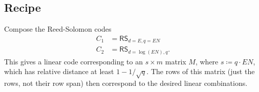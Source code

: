 \documentclass[11pt]{scrreprt}
\begin{document}
\subsection{Recipe}
Compose the Reed-Solomon codes
\begin{align*}
  C_1 &= \mathsf{RS}_{d=E,q=EN} \\
  C_2 &= \mathsf{RS}_{d=\log(EN),q}.
\end{align*}
This gives a linear code corresponding to an $s \times m$ matrix $M$,
where $s \coloneqq q \cdot EN$, which has relative distance at least $1 - 1/\sqrt q$.
The rows of this matrix (just the rows, not their row span)
then correspond to the desired linear combinations.
\end{document}
